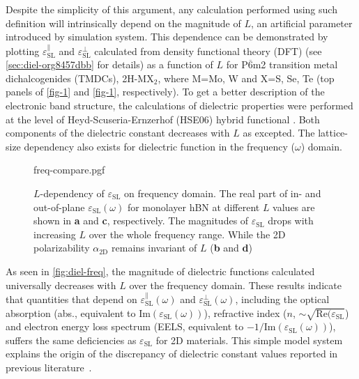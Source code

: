 %
%
Despite  the simplicity of this argument, any calculation performed
using such definition will intrinsically depend on the magnitude of
$L$, an artificial parameter introduced by simulation system. This
dependence can be demonstrated by plotting
$\varepsilon^{\parallel}_{\mathrm{SL}}$ and
$\varepsilon^{\perp}_{\mathrm{SL}}$ calculated from density functional
theory (DFT) (see \autoref{sec:diel-org8457dbb} for details) as a
function of $L$ for P$\overline{6}$m2 transition metal dichalcogenides
(TMDCs), 2H-MX$_{2}$, where M=Mo, W and X=S, Se, Te (top panels of
\autoref{fig-1} and \autoref{fig-1}, respectively). To get
a better description of the electronic band structure, the
calculations of dielectric properties were performed at the level of
Heyd-Scuseria-Ernzerhof (HSE06) hybrid functional
\autocite{Heyd_2003_HSe,HSE_2006_erratum}.  Both components of the
dielectric constant decreases with $L$ as excepted.  The lattice-size
dependency also exists for dielectric function in the frequency
($\omega$) domain. 
\begin{figure}[!htbp]
\centering
{freq-compare.pgf}
\caption{\label{fig:diel-freq}
  $L$-dependency of $\varepsilon_{\mathrm{SL}}$ on frequency
  domain. The real part of in- and out-of-plane
  $\varepsilon_{\mathrm{SL}}(\omega)$ for monolayer hBN at different
  $L$ values are shown in \textbf{a} and \textbf{c}, respectively. The
  magnitudes of $\varepsilon_{\mathrm{SL}}$ drops with increasing $L$
  over the whole frequency range. While the 2D polarizability
  $\alpha_{\mathrm{2D}}$ remains invariant of $L$ (\textbf{b} and
  \textbf{d})}
\end{figure}
%
As seen in \autoref{fig:diel-freq}, the magnitude of dielectric
functions calculated universally decreases with $L$ over the frequency
domain.  These results indicate that quantities that depend on
$\varepsilon^{\parallel}_{\mathrm{SL}}(\omega)$ and
$\varepsilon^{\perp}_{\mathrm{SL}}(\omega)$, including the optical
absorption (abs., equivalent to
$\mathrm{Im}(\varepsilon_{\mathrm{SL}}(\omega))$), refractive index
($n$, $\sim{}\sqrt{\mathrm{Re}(\varepsilon_{\mathrm{SL}}}$) and
electron energy loss spectrum (EELS, equivalent to
$-1 / \mathrm{Im}(\varepsilon_{\mathrm{SL}}(\omega))$), suffers the
same deficiencies as $\varepsilon_{\mathrm{SL}}$ for 2D
materials. This simple model system explains the origin of the
discrepancy of dielectric constant values reported in previous
literature~\autocite{Li_2016_screening_rev}.
%
%
%
%
%


